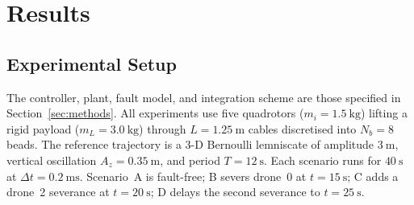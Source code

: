 %

\section{Results}
\label{sec:results}

\newcommand{\NEWRmsA}{0.89}
\newcommand{\NEWPeakA}{4.51}
\newcommand{\NEWPeakTA}{201.55}
\newcommand{\NEWPeakFA}{150.00}
\newcommand{\NEWSigA}{5.69}
\newcommand{\NEWRmsB}{0.86}
\newcommand{\NEWPeakB}{4.42}
\newcommand{\NEWPeakTB}{284.92}
\newcommand{\NEWPeakFB}{150.00}
\newcommand{\NEWSigB}{6.98}
\newcommand{\NEWRmsC}{0.81}
\newcommand{\NEWPeakC}{4.05}
\newcommand{\NEWPeakTC}{311.97}
\newcommand{\NEWPeakFC}{150.00}
\newcommand{\NEWSigC}{8.37}
\newcommand{\NEWRmsD}{0.81}
\newcommand{\NEWPeakD}{3.98}
\newcommand{\NEWPeakTD}{313.42}
\newcommand{\NEWPeakFD}{150.00}
\newcommand{\NEWSigD}{8.22}
\newcommand{\NEWGapRatio}{1.00}
\newcommand{\NEWQPactive}{0.021}
\newcommand{\NEWQPsolve}{37}

\subsection{Experimental Setup}
\label{sec:results:setup}
The controller, plant, fault model, and integration scheme are those
specified in Section~\ref{sec:methods}. All experiments use five
quadrotors ($m_i=\SI{1.5}{\kilo\gram}$) lifting a rigid payload
($m_L=\SI{3.0}{\kilo\gram}$) through $L=\SI{1.25}{\metre}$ cables
discretised into $N_b=8$ beads. The reference trajectory is a 3-D
Bernoulli lemniscate of amplitude $\SI{3}{\metre}$, vertical
oscillation $A_z=\SI{0.35}{\metre}$, and period $T=\SI{12}{\second}$.
Each scenario runs for $\SI{40}{\second}$ at
$\Delta t=\SI{0.2}{\milli\second}$. Scenario~A is fault-free; B severs
drone~0 at $t=\SI{15}{\second}$; C adds a drone~2 severance at
$t=\SI{20}{\second}$; D delays the second severance to
$t=\SI{25}{\second}$.

